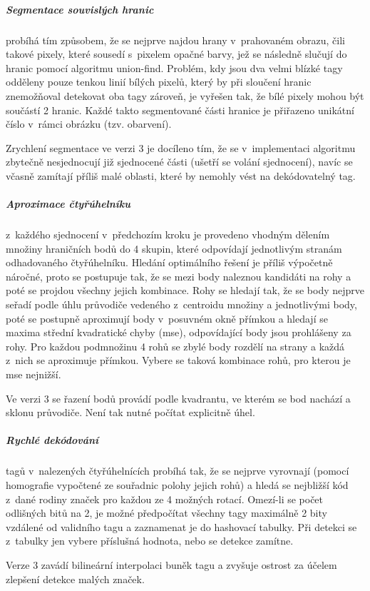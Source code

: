   \subparagraph{Segmentace souvislých hranic} probíhá tím způsobem, že se nejprve najdou hrany v~prahovaném obrazu, čili takové pixely, které sousedí s~pixelem opačné barvy, jež se následně slučují do hranic pomocí algoritmu union-find. Problém, kdy jsou dva velmi blízké tagy odděleny pouze tenkou linií bílých pixelů, který by při sloučení hranic znemožňoval detekovat oba tagy zároveň, je vyřešen tak, že bílé pixely mohou být součástí 2 hranic. Každé takto segmentované části hranice je přiřazeno unikátní číslo v~rámci obrázku (tzv. obarvení). \cite{apriltag2}
  
  Zrychlení segmentace ve verzi 3 je docíleno tím, že se v~implementaci algoritmu zbytečně nesjednocují již sjednocené části (ušetří se volání sjednocení), navíc se včasně zamítají příliš malé oblasti, které by nemohly vést na dekódovatelný tag. \cite{apriltag3}

  \subparagraph{Aproximace čtyřúhelníku} z~každého sjednocení v~předchozím kroku je provedeno vhodným dělením množiny hraničních bodů do 4 skupin, které odpovídají jednotlivým stranám odhadovaného čtyřúhelníku. Hledání optimálního řešení je příliš výpočetně náročné, proto se postupuje tak, že se mezi body naleznou kandidáti na rohy a poté se projdou všechny jejich kombinace. Rohy se hledají tak, že se body nejprve seřadí podle úhlu průvodiče vedeného z~centroidu množiny a jednotlivými body, poté se postupně aproximují body v~posuvném okně přímkou a hledají se maxima střední kvadratické chyby (\acrshort{mse}), odpovídající body jsou prohlášeny za rohy. Pro každou podmnožinu 4 rohů se zbylé body rozdělí na strany a každá z~nich se aproximuje přímkou. Vybere se taková kombinace rohů, pro kterou je \acrshort{mse} nejnižší. \cite{apriltag2}
  
  Ve verzi 3 se řazení bodů provádí podle kvadrantu, ve kterém se bod nachází a sklonu průvodiče. Není tak nutné počítat explicitně úhel. \cite{apriltag3}

  \subparagraph{Rychlé dekódování} tagů v~nalezených čtyřúhelnících probíhá tak, že se nejprve vyrovnají (pomocí homografie vypočtené ze souřadnic polohy jejich rohů) a hledá se nejbližší kód z~dané rodiny značek pro každou ze 4 možných rotací. Omezí-li se počet odlišných bitů na 2, je možné předpočítat všechny tagy maximálně 2 bity vzdálené od validního tagu a zaznamenat je do hashovací tabulky. Při detekci se z~tabulky jen vybere příslušná hodnota, nebo se detekce zamítne. \cite{apriltag2}
  
  Verze 3 zavádí bilineární interpolaci buněk tagu a zvyšuje ostrost za účelem zlepšení detekce malých značek. \cite{apriltag3}